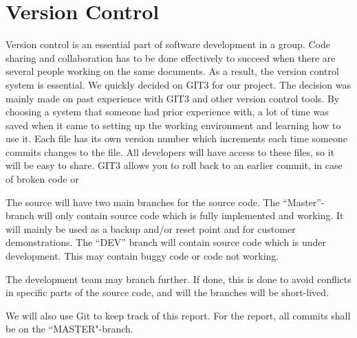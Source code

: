 \section{Version Control}

Version control is an essential part of software development in a group. Code
sharing and collaboration has to be done effectively to succeed when there are
several people working on the same documents. As a result, the version control
system is essential. We quickly decided on GIT3 for our project. The decision
was mainly made on past experience with GIT3 and other version control tools.
By choosing a system that someone had prior experience with, a lot of time was
saved when it came to setting up the working environment and learning how to
use it. Each ﬁle has its own version number which increments each time someone
commits changes to the ﬁle. All developers will have access to these files, so
it will be easy to share. GIT3 allows you to roll back to an earlier commit, in
case of broken code or

The source will have two main branches for the source code. The
``Master''-branch
will only contain source code which is fully implemented and working. It will
mainly be used as a backup and/or reset point and for customer demonstrations. 
The “DEV” branch will contain source code which is under development. This may
contain buggy code or code not working.

The development team may branch further. If done, this is done to avoid
conflicts in specific parts of the source code, and will the branches will be short-lived.

We will also use Git to keep track of this report. For the report, all commits shall be 
on the ``MASTER"-branch.